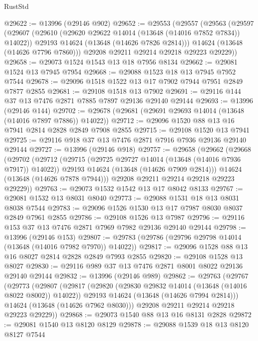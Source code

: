 \begin{lexlean}{RustStd}
\begin{coremodule}
@29622 := @13996 (@29146 @902)
@29652 := @29553
    (@29557
      (@29563
        (@29597
          (@29607
            (@29610 (@29620 @29622 @14014 (@13648 (@14016 @7852 @7834)) @14022))
            @29193
            @14624
            (@13648 (@14626 @7826 @2814)))
          @14624
          (@13648 (@14626 @7796 @7860)))
        @29208
        @29211
        @29214
        @29218
        @29223
        @29229))
@29658 := @29073 @1524 @1543 @13 @18 @7956 @8134
@29662 := @29081 @1524 @13 @7945 @7954
@29668 := @29088 @1523 @18 @13 @7945 @7952 @7544
@29678 := @29096 @1518 @1522 @13 @17 @7902 @7944 @7951 @2849 @7877 @2855
@29681 := @29108 @1518 @13 @7902
@29691 := @29116 @144 @37 @13 @7476 @2871 @7885 @7897 @29136 @29140 @29144
@29693 := @13996 (@29146 @144)
@29702 := @29678 (@29681 (@29691 @29693 @14014 (@13648 (@14016 @7897 @7886)) @14022))
@29712 := @29096 @1520 @88 @13 @16 @7941 @2814 @2828 @2849 @7908 @2855
@29715 := @29108 @1520 @13 @7941
@29725 := @29116 @918 @37 @13 @7476 @2871 @7916 @7936 @29136 @29140 @29144
@29727 := @13996 (@29146 @918)
@29757 := @29658
    (@29662
      (@29668
        (@29702
          (@29712
            (@29715 (@29725 @29727 @14014 (@13648 (@14016 @7936 @7917)) @14022))
            @29193
            @14624
            (@13648 (@14626 @7909 @2814)))
          @14624
          (@13648 (@14626 @7878 @7944)))
        @29208
        @29211
        @29214
        @29218
        @29223
        @29229))
@29763 := @29073 @1532 @1542 @13 @17 @8042 @8133
@29767 := @29081 @1532 @13 @8031 @8040
@29773 := @29088 @1531 @18 @13 @8031 @8038 @7544
@29783 := @29096 @1526 @1530 @13 @17 @7987 @8030 @8037 @2849 @7961 @2855
@29786 := @29108 @1526 @13 @7987
@29796 := @29116 @153 @37 @13 @7476 @2871 @7969 @7982 @29136 @29140 @29144
@29798 := @13996 (@29146 @153)
@29807 := @29783 (@29786 (@29796 @29798 @14014 (@13648 (@14016 @7982 @7970)) @14022))
@29817 := @29096 @1528 @88 @13 @16 @8027 @2814 @2828 @2849 @7993 @2855
@29820 := @29108 @1528 @13 @8027
@29830 := @29116 @989 @37 @13 @7476 @2871 @8001 @8022 @29136 @29140 @29144
@29832 := @13996 (@29146 @989)
@29862 := @29763
    (@29767
      (@29773
        (@29807
          (@29817
            (@29820 (@29830 @29832 @14014 (@13648 (@14016 @8022 @8002)) @14022))
            @29193
            @14624
            (@13648 (@14626 @7994 @2814)))
          @14624
          (@13648 (@14626 @7962 @8030)))
        @29208
        @29211
        @29214
        @29218
        @29223
        @29229))
@29868 := @29073 @1540 @88 @13 @16 @8131 @2828
@29872 := @29081 @1540 @13 @8120 @8129
@29878 := @29088 @1539 @18 @13 @8120 @8127 @7544

\end{coremodule}
\end{lexlean}
